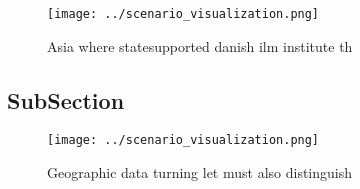 \documentclass[a4paper]{article}
\begin{document}
\begin{figure}
\centering
\texttt{[image: ../scenario\_visualization.png]}
\caption{Asia where statesupported danish ilm institute th
}
\end{figure}
 
\subsection{SubSection}

\begin{figure}
\centering
\texttt{[image: ../scenario\_visualization.png]}
\caption{Geographic data turning let must also distinguish
}
\end{figure}
 
\end{document}
